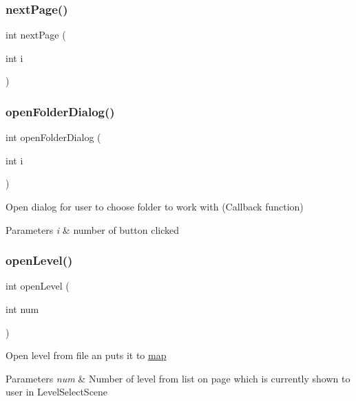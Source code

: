\subsubsection{\texorpdfstring{next\+Page()}{nextPage()}}
{\footnotesize\ttfamily int next\+Page (\begin{DoxyParamCaption}\item[{int}]{i }\end{DoxyParamCaption})}

\mbox{\label{group___core_gae327268c8424aa3cb6cea07ea33a3019}} 
\subsubsection{\texorpdfstring{open\+Folder\+Dialog()}{openFolderDialog()}}
{\footnotesize\ttfamily int open\+Folder\+Dialog (\begin{DoxyParamCaption}\item[{int}]{i }\end{DoxyParamCaption})}

Open dialog for user to choose folder to work with (Callback function) 
\begin{DoxyParams}{Parameters}
{\em i} & number of button clicked \\
\hline
\end{DoxyParams}
\mbox{\label{group___core_ga26c5e4f4587adfc14630f09bf91338ba}} 
\subsubsection{\texorpdfstring{open\+Level()}{openLevel()}}
{\footnotesize\ttfamily int open\+Level (\begin{DoxyParamCaption}\item[{int}]{num }\end{DoxyParamCaption})}

Open level from file an puts it to \hyperlink{group___library_merger_gaf3cf0ba525aea0327b3c3512df21094a}{map} 
\begin{DoxyParams}{Parameters}
{\em num} & Number of level from list on page which is currently shown to user in Level\+Select\+Scene \\
\hline
\end{DoxyParams}

